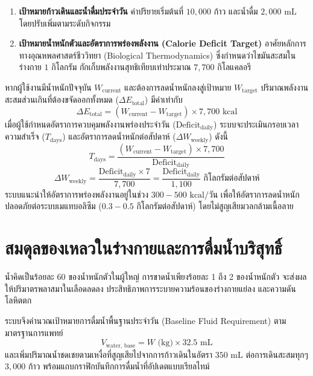 \begin{enumerate}
    \item \textbf{เป้าหมายก้าวเดินและน้ำดื่มประจำวัน} ค่าปริยายเริ่มต้นที่ $10{,}000$ ก้าว และน้ำดื่ม $2{,}000\text{ mL}$ โดยปรับเพิ่มตามระดับกิจกรรม
    \item \textbf{เป้าหมายน้ำหนักตัวและอัตราการพร่องพลังงาน (Calorie Deficit Target)} อาศัยหลักการทางอุณหพลศาสตร์ชีววิทยา (Biological Thermodynamics) ซึ่งกำหนดว่าไขมันสะสมในร่างกาย $1\text{ กิโลกรัม}$ กักเก็บพลังงานสุทธิเทียบเท่าประมาณ $7{,}700\text{ กิโลแคลอรี}$
\end{enumerate}

หากผู้ใช้งานมีน้ำหนักปัจจุบัน $W_{\text{current}}$ และต้องการลดน้ำหนักลงสู่เป้าหมาย $W_{\text{target}}$ ปริมาณพลังงานสะสมส่วนเกินที่ต้องขจัดออกทั้งหมด ($\Delta E_{\text{total}}$) มีค่าเท่ากับ
\begin{equation}
\Delta E_{\text{total}} = (W_{\text{current}} - W_{\text{target}}) \times 7{,}700\text{ kcal}
\end{equation}
เมื่อผู้ใช้กำหนดอัตราการควบคุมพลังงานพร่องประจำวัน ($\text{Deficit}_{\text{daily}}$) ระบบจะประเมินกรอบเวลาความสำเร็จ ($T_{\text{days}}$) และอัตราการลดน้ำหนักต่อสัปดาห์ ($\Delta W_{\text{weekly}}$) ดังนี้
\begin{equation}
T_{\text{days}} = \frac{(W_{\text{current}} - W_{\text{target}}) \times 7{,}700}{\text{Deficit}_{\text{daily}}}
\end{equation}
\begin{equation}
\Delta W_{\text{weekly}} = \frac{\text{Deficit}_{\text{daily}} \times 7}{7{,}700} = \frac{\text{Deficit}_{\text{daily}}}{1{,}100}\text{ กิโลกรัมต่อสัปดาห์}
\end{equation}
ระบบแนะนำให้อัตราการพร่องพลังงานอยู่ในช่วง $300 - 500\text{ kcal/วัน}$ เพื่อให้อัตราการลดน้ำหนักปลอดภัยต่อระบบเมแทบอลิซึม ($0.3 - 0.5\text{ กิโลกรัมต่อสัปดาห์}$) โดยไม่สูญเสียมวลกล้ามเนื้อลาย

\section{สมดุลของเหลวในร่างกายและการดื่มน้ำบริสุทธิ์}
น้ำคิดเป็นร้อยละ 60 ของน้ำหนักตัวในผู้ใหญ่ การขาดน้ำเพียงร้อยละ 1 ถึง 2 ของน้ำหนักตัว จะส่งผลให้ปริมาตรพลาสมาในเลือดลดลง ประสิทธิภาพการระบายความร้อนของร่างกายแย่ลง และความดันโลหิตตก

ระบบจึงคำนวณเป้าหมายการดื่มน้ำพื้นฐานประจำวัน (Baseline Fluid Requirement) ตามมาตรฐานการแพทย์
\begin{equation}
V_{\text{water, base}} = W\text{ (kg)} \times 32.5\text{ mL}
\end{equation}
และเพิ่มปริมาณน้ำชดเชยตามเหงื่อที่สูญเสียไปจากการก้าวเดินในอัตรา $350\text{ mL}$ ต่อการเดินสะสมทุกๆ $3{,}000$ ก้าว พร้อมแถบกราฟิกบันทึกการดื่มน้ำที่อัปเดตแบบเรียลไทม์

